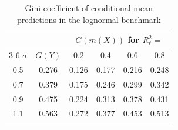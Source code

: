 \begin{table}[ht]
\caption{Gini coefficient of conditional-mean predictions in the lognormal benchmark}\label{tab:lognormal}%
\begin{tabular}{@{}cccccc@{}}
\toprule
 & & \multicolumn{4}{c}{$G(m(X))$ for $R^2_\ell=$}\\
\cmidrule{3-6}
$\sigma$ & $G(Y)$ & 0.2 & 0.4 & 0.6 & 0.8\\
\midrule
0.5 & 0.276 & 0.126 & 0.177 & 0.216 & 0.248 \\
0.7 & 0.379 & 0.175 & 0.246 & 0.299 & 0.342 \\
0.9 & 0.475 & 0.224 & 0.313 & 0.378 & 0.431 \\
1.1 & 0.563 & 0.272 & 0.377 & 0.453 & 0.513 \\
\botrule
\end{tabular}
\end{table}

